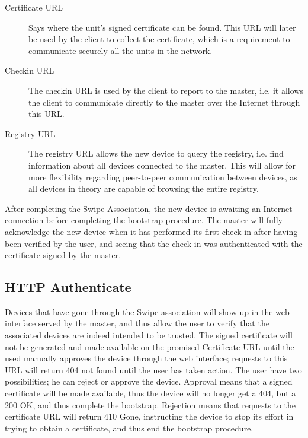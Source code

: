 \begin{description}
\item[Certificate URL]
    Says where the unit's signed certificate can be found. This URL will later be used by the client to collect the certificate, which is a requirement to communicate securely all the units in the network.
\item[Checkin URL]
    The checkin URL is used by the client to report to the master, i.e. it allows the client to communicate directly to the master over the Internet through this URL.
\item[Registry URL]
    The registry URL allows the new device to query the registry, i.e. find information about all devices connected to the master. This will allow for more flexibility regarding peer-to-peer communication between devices, as all devices in theory are capable of browsing the entire registry.
\end{description}

After completing the Swipe Association, the new device is awaiting an Internet connection before completing the bootstrap procedure. The master will fully acknowledge the new device when it has performed its first check-in after having been verified by the user, and seeing that the check-in was authenticated with the certificate signed by the master.

\subsection{HTTP Authenticate}
Devices that have gone through the Swipe association will show up in the web interface served by the master, and thus allow the user to verify that the associated devices are indeed intended to be trusted. The signed certificate will not be generated and made available on the promised Certificate URL until the used manually approves the device through the web interface; requests to this URL will return 404 not found until the user has taken action.
The user have two possibilities; he can reject or approve the device. Approval means that a signed certificate will be made available, thus the device will no longer get a 404, but a 200 OK, and thus complete the bootstrap. Rejection means that requests to the certificate URL will return 410 Gone, instructing the device to stop its effort in trying to obtain a certificate, and thus end the bootstrap procedure.

